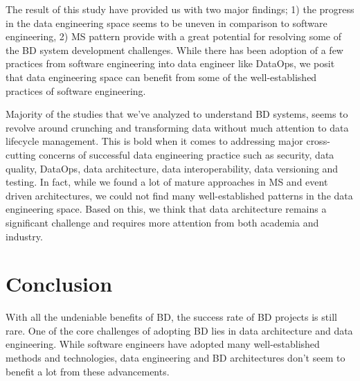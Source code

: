 \documentclass{bmcart}
\begin{document}

The result of this study have provided us with two major findings; 1) the progress in the data engineering space seems to be uneven in comparison to software engineering, 2) MS pattern provide with a great potential for resolving some of the BD system development challenges. While there has been adoption of a few practices from software engineering into data engineer like DataOps, we posit that data engineering space can benefit from some of the well-established practices of software engineering. 

Majority of the studies that we've analyzed to understand BD systems, seems to revolve around crunching and transforming data without much attention to data lifecycle management. This is bold when it comes to addressing major cross-cutting concerns of successful data engineering practice such as security, data quality, DataOps, data architecture, data interoperability, data versioning and testing. In fact, while we found a lot of mature approaches in MS and event driven architectures, we could not find many well-established patterns in the data engineering space. Based on this, we think that data architecture remains a significant challenge and requires more attention from both academia and industry. 



 
\section{Conclusion}
With all the undeniable benefits of BD, the success rate of BD projects is still rare. One of the core challenges of adopting BD lies in data architecture and data engineering. While software engineers have adopted many well-established methods and technologies, data engineering and BD architectures don't seem to benefit a lot from these advancements. 
\end{document}
